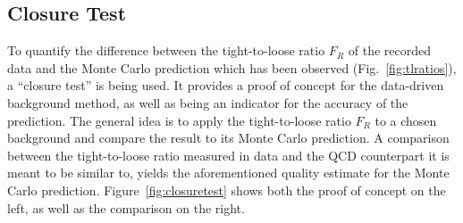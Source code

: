 \subsection{Closure Test}
\label{sec:closure-test}

To quantify the difference between the tight-to-loose ratio $F_R$ of the recorded data and the Monte Carlo prediction which has been observed (Fig.~\ref{fig:tlratios}), a ``closure test'' is being used. It provides a proof of concept for the data-driven background method, as well as being an indicator for the accuracy of the prediction. The general idea is to apply the tight-to-loose ratio $F_R$ to a chosen background and compare the result to its Monte Carlo prediction. A comparison between the tight-to-loose ratio measured in data and the QCD counterpart it is meant to be similar to, yields the aforementioned quality estimate for the Monte Carlo prediction. Figure~\ref{fig:closuretest} shows both the proof of concept on the left, as well as the comparison on the right.

